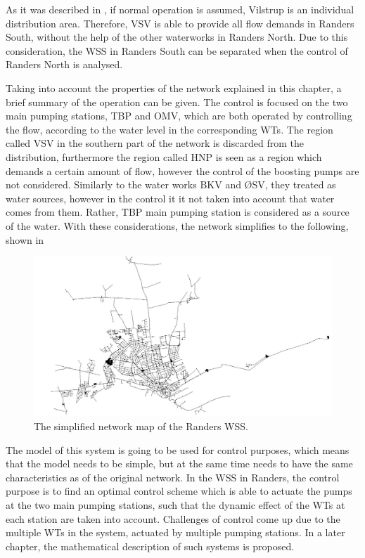 As it was described in , if normal operation is assumed, Vilstrup is an individual distribution area. Therefore, VSV is able to provide all flow demands in Randers South, without the help of the other waterworks in Randers North. Due to this consideration, the WSS in Randers South can be separated when the control of Randers North is analysed. 

Taking into account the properties of the network explained in this chapter, a brief summary of the operation can be given. The control is focused on the two main pumping stations, TBP and OMV, which are both operated by controlling the flow, according to the water level in the corresponding WTs. The region called VSV in the southern part of the network is discarded from the distribution, furthermore the region called HNP is seen as a region which demands a certain amount of flow, however the control of the boosting pumps are not considered. Similarly to the water works BKV and ØSV, they treated as water sources, however in the control it it not taken into account that water comes from them. Rather, TBP main pumping station is considered as a source of the water. With these considerations, the network simplifies to the following, shown in 

\begin{figure}[H]
\centering
\includegraphics[width=1.02\textwidth]{report/pictures/verdo_pic2}
\caption{The simplified network map of the Randers WSS.}
\label{fig:simplified_network}
\end{figure}

\vspace{-3mm}
The model of this system is going to be used for control purposes, which means that the model needs to be simple, but at the same time needs to have the same characteristics as of the original network. In the WSS in Randers, the control purpose is to find an optimal control scheme which is able to actuate the pumps at the two main pumping stations, such that the dynamic effect of the WTs at each station are taken into account. Challenges of control come up due to the multiple WTs in the system, actuated by multiple pumping stations. In a later chapter, the mathematical description of such systems is proposed. 








